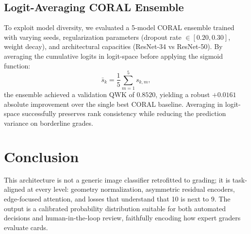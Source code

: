 \documentclass[12pt]{article}
\begin{document}
\subsection{Logit-Averaging CORAL Ensemble}
To exploit model diversity, we evaluated a 5-model CORAL ensemble trained with varying seeds, regularization parameters (dropout rate $\in [0.20, 0.30]$, weight decay), and architectural capacities (ResNet-34 vs ResNet-50).
By averaging the cumulative logits in logit-space before applying the sigmoid function:
\[
\bar{s}_k = \frac{1}{5}\sum_{m=1}^{5} s_{k,m},
\]
the ensemble achieved a validation QWK of \textbf{$0.8520$}, yielding a robust $+0.0161$ absolute improvement over the single best CORAL baseline. Averaging in logit-space successfully preserves rank consistency while reducing the prediction variance on borderline grades.


\section{Conclusion}
This architecture is not a generic image classifier retrofitted to grading; it is task-aligned at every level: geometry normalization, asymmetric residual encoders, edge-focused attention, and losses that understand that 10 is next to 9. 
The output is a calibrated probability distribution suitable for both automated decisions and human-in-the-loop review, faithfully encoding how expert graders evaluate cards.
\end{document}
